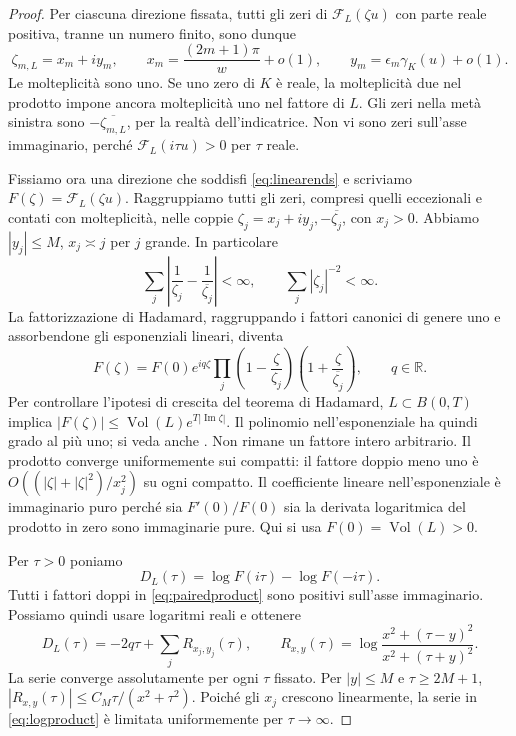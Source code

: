 \documentclass[11pt,a4paper]{article}
\theoremstyle{remark}
\newcommand{\R}{\mathbb R}
\newcommand{\vol}{\operatorname{Vol}}
\begin{document}
\begin{proof}
Per ciascuna direzione fissata, tutti gli zeri di $\mathcal F_L(\zeta u)$
con parte reale positiva, tranne un numero finito, sono dunque
\begin{equation}\label{eq:chosenroots}
\zeta_{m,L}=x_m+i y_m,\qquad
x_m=\frac{(2m+1)\pi}{w}+o(1),\qquad
y_m=\epsilon_m\gamma_K(u)+o(1).
\end{equation}
Le molteplicità sono uno. Se uno zero di $K$ è reale, la molteplicità
due nel prodotto impone ancora molteplicità uno nel fattore di $L$.
Gli zeri nella metà sinistra sono $-\overline{\zeta_{m,L}}$, per la
realtà dell'indicatrice. Non vi sono zeri sull'asse immaginario, perché
$\mathcal F_L(i\tau u)>0$ per $\tau$ reale.

Fissiamo ora una direzione che soddisfi \eqref{eq:linearends} e
scriviamo $F(\zeta)=\mathcal F_L(\zeta u)$.
Raggruppiamo tutti gli zeri, compresi quelli eccezionali e contati con
molteplicità, nelle coppie $\zeta_j=x_j+iy_j,-\overline{\zeta_j}$,
con $x_j>0$. Abbiamo $|y_j|\leq M$, $x_j\asymp j$ per $j$ grande.
In particolare
\[
\sum_j\left|\frac1{\zeta_j}-\frac1{\overline{\zeta_j}}\right|<\infty,
\qquad \sum_j|\zeta_j|^{-2}<\infty.
\]
La fattorizzazione di Hadamard, raggruppando i fattori canonici di
genere uno e assorbendone gli esponenziali lineari, diventa
\begin{equation}\label{eq:pairedproduct}
F(\zeta)=F(0)e^{iq\zeta}
\prod_j\left(1-\frac{\zeta}{\zeta_j}\right)
       \left(1+\frac{\zeta}{\overline{\zeta_j}}\right),\qquad q\in\R.
\end{equation}
Per controllare l'ipotesi di crescita del teorema di Hadamard,
$L\subset B(0,T)$ implica
$|F(\zeta)|\leq\vol(L)e^{T|\operatorname{Im}\zeta|}$.
Il polinomio nell'esponenziale ha quindi grado al più uno; si veda
anche \cite[p.~4]{Siu24}. Non rimane un fattore intero arbitrario.
Il prodotto converge uniformemente sui compatti: il fattore doppio
meno uno è $O((|\zeta|+|\zeta|^2)/x_j^2)$ su ogni compatto.
Il coefficiente lineare nell'esponenziale è immaginario puro perché sia
$F'(0)/F(0)$ sia la derivata logaritmica del prodotto in zero sono
immaginarie pure. Qui si usa $F(0)=\vol(L)>0$.

Per $\tau>0$ poniamo
\[
D_L(\tau)=\log F(i\tau)-\log F(-i\tau).
\]
Tutti i fattori doppi in \eqref{eq:pairedproduct} sono positivi
sull'asse immaginario. Possiamo quindi usare logaritmi reali e ottenere
\begin{equation}\label{eq:logproduct}
D_L(\tau)=-2q\tau+\sum_j R_{x_j,y_j}(\tau),\qquad
R_{x,y}(\tau)=
\log\frac{x^2+(\tau-y)^2}{x^2+(\tau+y)^2}.
\end{equation}
La serie converge assolutamente per ogni $\tau$ fissato.
Per $|y|\leq M$ e $\tau\geq2M+1$,
$|R_{x,y}(\tau)|\leq C_M\tau/(x^2+\tau^2)$.
Poiché gli $x_j$ crescono linearmente, la serie in
\eqref{eq:logproduct} è limitata uniformemente per $\tau\to\infty$.


\end{proof}
\end{document}
